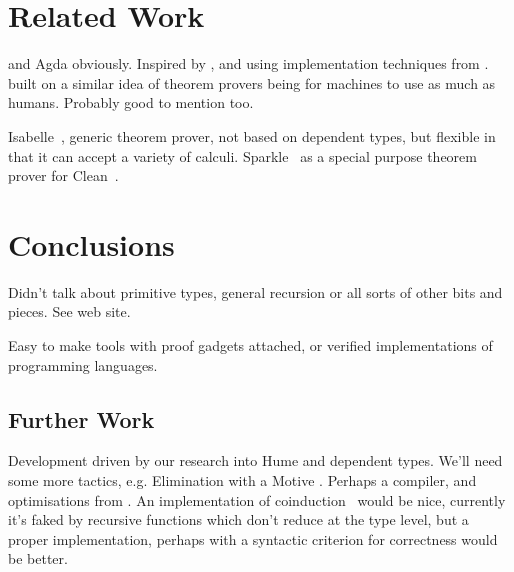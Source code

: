 \section{Related Work}

\Coq{} \cite{coq-manual} and Agda \cite{agda} obviously. Inspired by
\cite{mcbride-thesis}, and using implementation techniques from
\cite{not-a-number}. \Epigram{}~\cite{view-left} built on
a similar idea of theorem provers being for machines to use as much as
humans. Probably good to mention \cite{epireloaded} too.

Isabelle~\cite{isabelle}, generic theorem prover, not based on
dependent types, but flexible in that it can accept a variety of
calculi.  Sparkle~\cite{sparkle} as a special purpose theorem prover
for Clean~\cite{clean}.

\section{Conclusions}

Didn't talk about primitive types, general recursion or all sorts of
other bits and pieces. See web site.

Easy to make tools with proof gadgets attached, or verified
implementations of programming languages.

\subsection{Further Work}

Development driven by our research into Hume and dependent types.
We'll need some more tactics, e.g. Elimination with a Motive
\cite{elim-motive}. Perhaps a compiler, and optimisations from
\cite{brady-thesis}. An implementation of
coinduction~\cite{coinductive} would be nice, currently it's faked by
recursive functions which don't reduce at the type level, but a proper
implementation, perhaps with a syntactic criterion for correctness
would be better.
